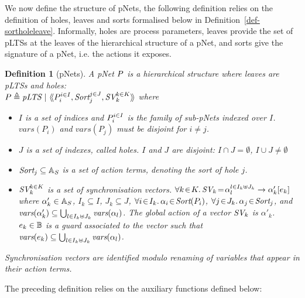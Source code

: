 \documentclass{lmcs}
\newtheorem{definition}{Definition}
\begin{document}
We now define the structure of pNets, the following definition relies on the definition 
of holes, leaves and sorts formalised below in Definition~\ref{def-sortholeleave}. Informally, holes are process parameters, leaves provide the set of pLTSs at the leaves of the hierarchical structure of a pNet, and sorts give the signature of a pNet, i.e. the actions it exposes.

\begin{definition}[pNets]\label{def-pnets}
A pNet $P$ is a hierarchical structure where leaves are pLTSs and holes:\\
$\pNet\triangleq \pLTS~|~\mylangle \pNet_i^{i\in I}, \Sort_j^{j\in J}, \symb{SV}_k^{k\in 
K}\myrangle$
where
\begin{itemize}
\item[$\bullet$] $I$ is a set of indices and $P_i^{i\in I}$ is the family of sub-pNets indexed over $I$. $vars(P_i)$ and $vars(P_j)$ must be disjoint for $i\neq j$.

\item[$\bullet$] $J$ is a set of indexes, called \emph{holes}.
$I$ and $J$ are \emph{disjoint}: $I\!\cap\! J=\emptyset$,  $I\!\cup\! J\neq\emptyset$
\item[$\bullet$] $\Sort_j \subseteq \AlgAS$  is a set of action terms, denoting the 
\emph{sort} of
hole $j$.

\item[$\bullet$] $\symb{SV}_k^{k\in K}$ is a set of
  synchronisation vectors. $\forall k\!\in\! K.\,
  \symb{SV}_k\!=\!\SV{\alpha_{l}^{l\in I_k \uplus J_k}}{\alpha'_k}{e_k}$ where
  $\alpha'_k\in \mathbb{A}_S$, $I_k\subseteq I$, $J_k\subseteq J$,
  $\forall i\!\in\!
  I_k.\,\alpha_{i}\!\in\!\Sort(\pNet_i)$,  $\forall j\!\in\!
  J_k.\,\alpha_{j}\!\in\!\Sort_j$, and $\vars(\alpha'_k)\subseteq \bigcup_{l\in I_k\uplus 
  J_k}{\vars({\alpha_l})}$. The global action of a vector $\symb{SV}_k$ is
$\alpha'_k$. $e_k \in \mathbb{B}$ is a guard associated to the vector such that
$\vars(e_k)\subseteq \bigcup_{l\in I_k\uplus J_k}{\vars({\alpha_l})}$.
\end{itemize}
Synchronisation vectors are identified modulo renaming of variables that appear in their 
action terms.
\end{definition}

The preceding definition relies on the auxiliary functions defined below:
\end{document}
